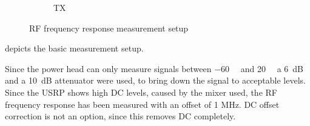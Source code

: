 \documentclass[12pt,a4paper,parskip=full,abstracton]{scrartcl}
\begin{document}
\begin{figure}[htb]
\begin{subfigure}[t]{.5\linewidth}
{
        }
        \caption{TX}
    \end{subfigure}
    \caption{RF frequency response measurement setup}
    \label{fig:rfsetup}
\end{figure}
 depicts the basic measurement setup.

Since the power head can only measure signals between \SI{-60}{\deci\belm} and
\SI{20}{\deci\belm} a \SI{6}{\deci\bel} and a \SI{10}{\deci\bel} attenuator were used,
to bring down the signal to acceptable levels. Since the USRP shows high DC levels,
caused by the mixer used, the RF frequency response has been measured with an offset
of 1 MHz. DC offset correction is not an option, since this removes DC completely.
\end{document}
